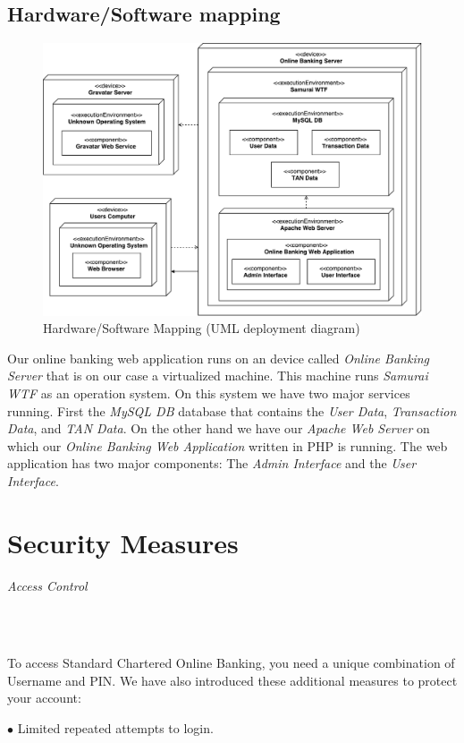 \documentclass[headsepline,footsepline,footinclude=false,oneside,fontsize=11pt,paper=a4,listof=totoc,bibliography=totoc]{scrbook} %
\begin{document}
\pagebreak
\section{Hardware/Software mapping}

\begin{figure}[!ht]
	\centering
	\includegraphics[scale=0.55]{figures/hw_sw_mapping.pdf}
	\caption{Hardware/Software Mapping (UML deployment diagram)}
	\label{fig1}
\end{figure}

Our online banking web application runs on an device called \textit{Online Banking Server} that is on our case a virtualized machine. This machine runs \textit{Samurai WTF} as an operation system. On this system we have two major services running. First the \textit{MySQL DB} database that contains the \textit{User Data}, \textit{Transaction Data}, and \textit{TAN Data}. On the other hand we have our \textit{Apache Web Server} on which our \textit{Online Banking Web Application} written in PHP is running. The web application has two major components: The \textit{Admin Interface} and the \textit{User Interface}.

\chapter{Security Measures}   
\subparagraph{Access Control}\

To access Standard Chartered Online Banking, you need a unique combination of Username and PIN. We have also introduced these additional measures to protect your account:

$\bullet$ Limited repeated attempts to login.\
\end{document}
